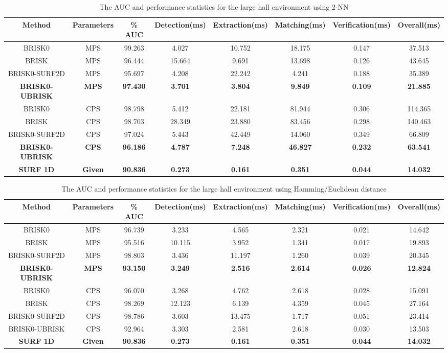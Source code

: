 \documentclass{report}
\begin{document}
\begin{table}

\tiny
\caption{The AUC and performance statistics for the large hall environment
using 2-NN}


\begin{tabular}{|c|c|c|c|c|c|c|c|}
\hline 
\textbf{Method} & \textbf{Parameters} & \textbf{\% AUC} & \textbf{Detection(ms)} & \textbf{Extraction(ms)} & \textbf{Matching(ms)} & \textbf{Verification(ms)} & \textbf{Overall(ms)}\tabularnewline
\hline 
\hline 
BRISK0 & MPS & 99.263 & 4.027 & 10.752 & 18.175 & 0.147 & 37.513\tabularnewline
\hline 
BRISK & MPS & 96.444 & 15.664 & 9.691 & 13.698 & 0.126 & 43.645\tabularnewline
\hline 
BRISK0-SURF2D & MPS & 95.697 & 4.208 & 22.242 & 4.241 & 0.188 & 35.389\tabularnewline
\hline 
\textbf{BRISK0-UBRISK} & \textbf{MPS} & \textbf{97.430} & \textbf{3.701} & \textbf{3.804} & \textbf{9.849} & \textbf{0.109} & \textbf{21.885}\tabularnewline
\hline 
BRISK0 & CPS & 98.798 & 5.412 & 22.181 & 81.944 & 0.306 & 114.365\tabularnewline
\hline 
BRISK & CPS & 98.703 & 28.349 & 23.880 & 83.456 & 0.298 & 140.463\tabularnewline
\hline 
BRISK0-SURF2D & CPS & 97.024 & 5.443 & 42.449 & 14.060 & 0.349 & 66.809\tabularnewline
\hline 
\textbf{BRISK0-UBRISK} & \textbf{CPS} & \textbf{96.186} & \textbf{4.787} & \textbf{7.248} & \textbf{46.827} & \textbf{0.232} & \textbf{63.541}\tabularnewline
\hline 
\textbf{SURF 1D} & \textbf{Given} & \textbf{90.836} & \textbf{0.273} & \textbf{0.161} & \textbf{0.351} & \textbf{0.044} & \textbf{14.032}\tabularnewline
\hline 
\end{tabular}
\label{tab:hallStatsKnn}
\end{table}


\begin{table}
\caption{The AUC and performance statistics for the large hall environment
using Hamming/Euclidean distance}
\tiny
\begin{tabular}{|c|c|c|c|c|c|c|c|}
\hline 
\textbf{Method} & \textbf{Parameters} & \textbf{\% AUC} & \textbf{Detection(ms)} & \textbf{Extraction(ms)} & \textbf{Matching(ms)} & \textbf{Verification(ms)} & \textbf{Overall(ms)}\tabularnewline
\hline 
\hline 
BRISK0 & MPS & 96.739 & 3.233 & 4.565 & 2.321 & 0.021 & 14.642\tabularnewline
\hline 
BRISK & MPS & 95.516 & 10.115 & 3.952 & 1.341 & 0.017 & 19.893\tabularnewline
\hline 
BRISK0-SURF2D & MPS & 98.803 & 3.436 & 11.197 & 1.260 & 0.039 & 20.345\tabularnewline
\hline 
\textbf{BRISK0-UBRISK} & \textbf{MPS} & \textbf{93.150} & \textbf{3.249} & \textbf{2.516} & \textbf{2.614} & \textbf{0.026} & \textbf{12.824}\tabularnewline
\hline 
BRISK0 & CPS & 96.070 & 3.268 & 4.762 & 2.618 & 0.028 & 15.091\tabularnewline
\hline 
BRISK & CPS & 98.269 & 12.123 & 6.139 & 4.359 & 0.045 & 27.164\tabularnewline
\hline 
BRISK0-SURF2D & CPS & 98.786 & 3.603 & 13.475 & 1.717 & 0.051 & 23.414\tabularnewline
\hline 
BRISK0-UBRISK & CPS & 92.964 & 3.303 & 2.581 & 2.618 & 0.030 & 13.503\tabularnewline
\hline 
\textbf{SURF 1D} & \textbf{Given} & \textbf{90.836} & \textbf{0.273} & \textbf{0.161} & \textbf{0.351} & \textbf{0.044} & \textbf{14.032}\tabularnewline
\hline 
\end{tabular}
\label{tab:hallStatsHamming}
\end{table}
\end{document}
